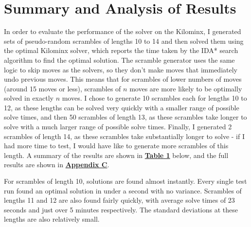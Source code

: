 \section{Summary and Analysis of Results}
\label{section:experiment}
In order to evaluate the performance of the solver on the Kilominx, I generated sets of pseudo-random scrambles of lengths 10 to 14 and then solved them using the optimal Kilominx solver, which reports the time taken by the IDA* search algorithm to find the optimal solution. The scramble generator uses the same logic to skip moves as the solvers, so they don't make moves that immediately undo previous moves. This means that for scrambles of lower numbers of moves (around 15 moves or less), scrambles of $n$ moves are more likely to be optimally solved in exactly $n$ moves. I chose to generate 10 scrambles each for lengths 10 to 12, as these lengths can be solved very quickly with a smaller range of possible solve times, and then 50 scrambles of length 13, as these scrambles take longer to solve with a much larger range of possible solve times. Finally, I generated 2 scrambles of length 14, as these scrambles take substantially longer to solve - if I had more time to test, I would have like to generate more scrambles of this length. A summary of the results are shown in \textbf{\hyperref[tab:results-summary]{Table 1}} below, and the full results are shown in \textbf{\hyperref[appendix:results]{Appendix C}}.

\begin{table}[h]
\centering
{}
\caption{A summary of the averages and standard deviations for the solve times of scramble lengths 10 to 14.}
\label{tab:results-summary}
\end{table}

For scrambles of length 10, solutions are found almost instantly. Every single test run found an optimal solution in under a second with no variance. Scrambles of lengths 11 and 12 are also found fairly quickly, with average solve times of 23 seconds and just over 5 minutes respectively. The standard deviations at these lengths are also relatively small.

